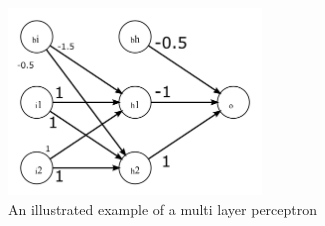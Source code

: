 \documentclass{article}           %
\begin{document}
\begin{figure}[H]
\begin{center}
\includegraphics[width=0.6\textwidth]{fig2.png}
\caption{An illustrated example of a multi layer perceptron}
\label{fig:mlp}
\end{center}
\end{figure}


\end{document}
